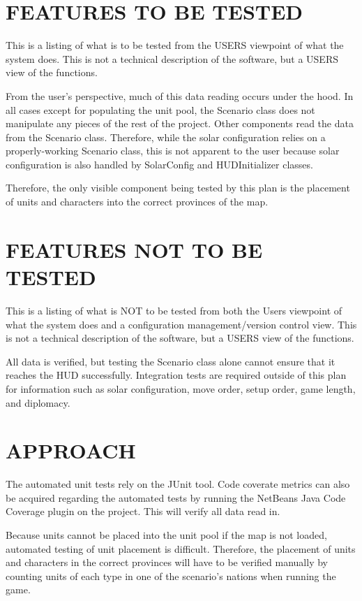 \section[FEATURES TO BE TESTED]{\bfseries\color{black} FEATURES TO BE TESTED}
{\itshape\color{black}

This is a listing of what is to be tested from the USERS viewpoint of
what the system does. This is not a technical description of the
software, but a USERS view of the functions.

}
{\color{black}
From the user's perspective, much of this data reading occurs under the hood. 
In all cases except for populating the unit pool, the Scenario class does not 
manipulate any pieces of the rest of the project. Other components read the 
data from the Scenario class. Therefore, while the solar configuration relies 
on a properly-working Scenario class, this is not apparent to the user because 
solar configuration is also handled by SolarConfig and HUDInitializer classes.

Therefore, the only visible component being tested by this plan is the placement 
of units and characters into the correct provinces of the map.}

\section[FEATURES NOT TO BE TESTED]{\bfseries\color{black}
	 FEATURES NOT TO BE TESTED}
{\itshape\color{black}

This is a listing of what is NOT to be tested from both the Users
viewpoint of what the system does and a configuration
management/version control view. This is not a technical description
of the software, but a USERS view of the functions.

}
{\color{black}
All data is verified, but testing the Scenario class alone cannot ensure 
that it reaches the HUD successfully. Integration tests are required outside 
of this plan for information such as solar configuration, move order, setup order, 
game length, and diplomacy.
}

\section[APPROACH]{\bfseries\color{black} APPROACH}
{\color{black}
The automated unit tests rely on the JUnit tool. Code coverate metrics can 
also be acquired regarding the automated tests by running the NetBeans Java 
Code Coverage plugin on the project. This will verify all data read in.

Because units cannot be placed into the unit pool if the map is not loaded, 
automated testing of unit placement is difficult. Therefore, the placement 
of units and characters in the correct provinces will have to 
be verified manually by counting units of each type in one of the scenario's 
nations when running the game.}

